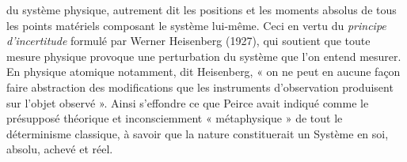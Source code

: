 du système physique, autrement dit les
positions et les moments absolus de tous
les points matériels composant le système
lui-même. Ceci en vertu du  {\it principe d’incertitude}  formulé par Werner Heisenberg
(1927), qui soutient que toute mesure
physique provoque une perturbation du
système que l’on entend mesurer. En physique atomique notamment, dit Heisenberg, « on ne peut en aucune façon faire
abstraction des modifications que les instruments d’observation produisent sur
l’objet observé ». Ainsi s'effondre ce que
Peirce avait indiqué comme le présupposé
théorique et inconsciemment « métaphysique » de tout le déterminisme classique,
à savoir que la nature constituerait un Système en soi, absolu, achevé et réel.


